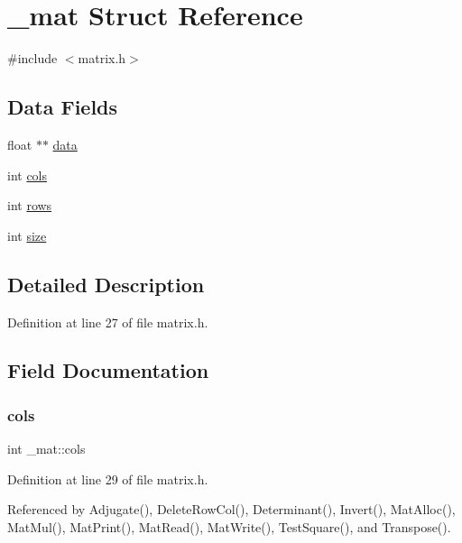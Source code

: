 \hypertarget{struct__mat}{}\section{\+\_\+mat Struct Reference}
\label{struct__mat}


{\ttfamily \#include $<$matrix.\+h$>$}

\subsection*{Data Fields}
\begin{DoxyCompactItemize}
\item 
float $\ast$$\ast$ \hyperlink{struct__mat_a00dcd82a8de11b7f16f7edfde55bcfae}{data}
\item 
int \hyperlink{struct__mat_a5ee73c0c8484d47a000464681b298762}{cols}
\item 
int \hyperlink{struct__mat_a5e6bcb8b0c0239ca9b782c48b0b3c98a}{rows}
\item 
int \hyperlink{struct__mat_ab54203ad7b60fc23832cb3b2a863857f}{size}
\end{DoxyCompactItemize}


\subsection{Detailed Description}


Definition at line 27 of file matrix.\+h.



\subsection{Field Documentation}
\mbox{\label{struct__mat_a5ee73c0c8484d47a000464681b298762}} 
\subsubsection{\texorpdfstring{cols}{cols}}
{\footnotesize\ttfamily int \+\_\+mat\+::cols}



Definition at line 29 of file matrix.\+h.



Referenced by Adjugate(), Delete\+Row\+Col(), Determinant(), Invert(), Mat\+Alloc(), Mat\+Mul(), Mat\+Print(), Mat\+Read(), Mat\+Write(), Test\+Square(), and Transpose().

